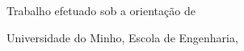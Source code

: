 \begin{titlepage}

\begin{center}
\thelogo
\end{center}

\vspace*{10mm}
\begin{center}
    {\huge\bfseries \thetitleA}
    \vspace{3mm}
    {\huge\bfseries \thetitleB}
    \vspace{3mm}
    {\huge\bfseries \thetitleC}
\end{center}

\vspace{10mm}
\begin{center}
    {\Large \themasters}
\end{center}

\vspace{8mm}
\begin{center}
    {\large \theauthor}
\end{center}

\vspace{10mm}
\begin{center}
    {\footnotesize Trabalho efetuado sob a orientação de\\
    \vspace{2mm}
    \textbf{\thesupervisor}}
\end{center}

\vspace{15mm}
\begin{center}
    {\large Universidade do Minho, Escola de Engenharia, \myear}
\end{center}

\end{titlepage}

\newpage
\thispagestyle{empty}
\mbox{} 